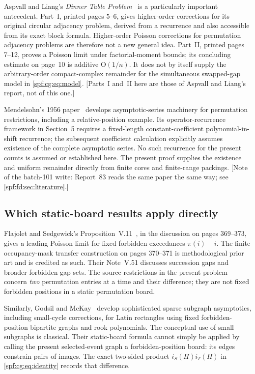 \documentclass[11pt]{article}
\numberwithin{equation}{section}
\theoremstyle{definition}
\theoremstyle{remark}
\theoremstyle{definition}
\newcommand{\bigO}{\mathrm O}
\begin{document}
Aspvall and Liang's \emph{Dinner Table Problem}~\cite{cgAspvall} is a
particularly important antecedent. Part~I, printed pages 5--6, gives
higher-order corrections for its original circular adjacency problem,
derived from a recurrence and also accessible from its exact block formula.
Higher-order Poisson corrections for permutation adjacency problems are
therefore not a new general idea. Part~II, printed pages 7--12, proves a
Poisson limit under factorial-moment bounds; its concluding estimate on
page~10 is additive $\bigO(1/n)$. It does not by itself supply the
arbitrary-order compact-complex remainder for the simultaneous swapped-gap
model in \eqref{spf:cg:eq:model}. [Parts~I and~II here are those of
Aspvall and Liang's report, not of this one.]

Mendelsohn's 1956 paper~\cite{fdMendelsohn} develops asymptotic-series
machinery for permutation restrictions, including a relative-position
example. Its operator-recurrence framework in Section~5 requires a
fixed-length constant-coefficient polynomial-in-shift recurrence; the
subsequent coefficient calculation explicitly assumes existence of the
complete asymptotic series. No such recurrence for the present counts is
assumed or established here. The present proof supplies the existence and
uniform remainder directly from finite cores and finite-range packings.
[Note of the batch-101 write: Report~83 reads the same paper the same way;
see \cref{spf:fd:sec:literature}.]

\subsection{Which static-board results apply directly}
Flajolet and Sedgewick's Proposition~V.11~\cite{cgFS}, in the discussion on
pages 369--373, gives a leading Poisson limit for fixed forbidden
exceedances $\pi(i)-i$. The finite occupancy-mask transfer construction on
pages 370--371 is methodological prior art and is credited as such.
Their Note~V.51 discusses succession gaps and broader forbidden gap sets.
The source restrictions in the present problem concern \emph{two}
permutation entries at a time and their difference; they are not fixed
forbidden positions in a static permutation board.

Similarly, Godsil and McKay~\cite{cgGodsil} develop sophisticated sparse
subgraph asymptotics, including small-cycle corrections, for Latin
rectangles using fixed forbidden-position bipartite graphs and rook
polynomials. The conceptual use of small subgraphs is classical. Their
static-board formula cannot simply be applied by calling the present
selected-event graph a forbidden-position board: its edges constrain pairs
of images. The exact two-sided product $i_S(H)i_T(H)$ in
\eqref{spf:cg:eq:identity} records that difference.
\end{document}

